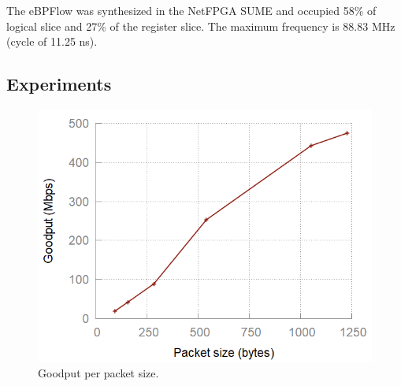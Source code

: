 
The eBPFlow was synthesized in the NetFPGA SUME and occupied 58\% of logical slice and 27\% of the register slice. The maximum frequency is 88.83 MHz (cycle of 11.25 ns).


\subsection{Experiments} 
\label{sec:experiments}


\begin{figure}[htb]
\centering
\includegraphics[width=1.\linewidth]{figures/goodputxbytes.png}
\caption{Goodput per packet size.}
\label{fig:07result}
\end{figure}



